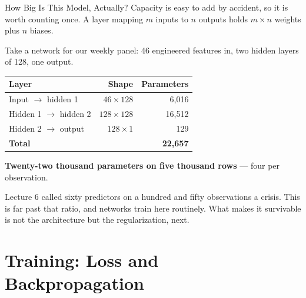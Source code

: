\documentclass[aspectratio=169, 11pt]{beamer}
\begin{document}
\begin{frame}{How Big Is This Model, Actually?}
  Capacity is easy to add by accident, so it is worth counting once. A layer mapping $m$ inputs
  to $n$ outputs holds $m \times n$ weights plus $n$ biases.

  \vspace{0.1cm}
  Take a network for our weekly panel: 46 engineered features in, two hidden layers of 128, one
  output.
  \begin{center}
    {\small
    \begin{tabular}{lrr}
      \toprule
      \textbf{Layer} & \textbf{Shape} & \textbf{Parameters} \\
      \midrule
      Input $\rightarrow$ hidden 1 & $46 \times 128$ & 6{,}016 \\
      Hidden 1 $\rightarrow$ hidden 2 & $128 \times 128$ & 16{,}512 \\
      Hidden 2 $\rightarrow$ output & $128 \times 1$ & 129 \\
      \midrule
      \textbf{Total} & & \textbf{22{,}657} \\
      \bottomrule
    \end{tabular}
    }
  \end{center}

  \textbf{Twenty-two thousand parameters on five thousand rows} --- four per observation.

  \vspace{0.1cm}
  Lecture 6 called sixty predictors on a hundred and fifty observations a crisis. This is far
  past that ratio, and networks train here routinely. What makes it survivable is not the
  architecture but the regularization, next.
\end{frame}

\section{Training: Loss and Backpropagation}

\end{document}
